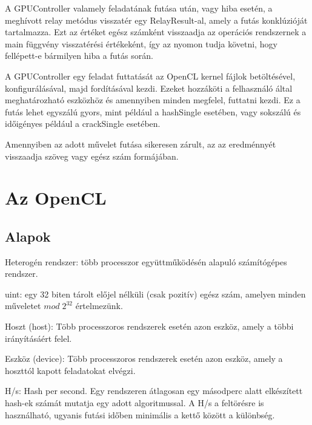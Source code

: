 A GPUController valamely feladatának futása után, vagy hiba esetén, a meghívott relay metódus visszatér egy RelayResult-al, amely a futás konklúzióját tartalmazza. Ezt az értéket egész számként visszaadja az operációs rendszernek a main függvény visszatérési értékeként, így az nyomon tudja követni, hogy fellépett-e bármilyen hiba a futás során.

A GPUController egy feladat futtatását az OpenCL kernel fájlok betöltésével, konfigurálásával, majd fordításával kezdi. Ezeket hozzáköti a felhasználó által meghatározható eszközhöz és amennyiben minden megfelel, futtatni kezdi. Ez a futás lehet egyszálú gyors, mint például a hashSingle esetében, vagy sokszálú és időigényes például a crackSingle esetében.

Amennyiben az adott művelet futása sikeresen zárult, az az eredménnyét visszaadja szöveg vagy egész szám formájában.

\section{Az OpenCL}



\subsection{Alapok}


\begin{definition}
Heterogén rendszer: több processzor együttműködésén alapuló számítógépes rendszer.
\end{definition}

\begin{definition}
uint: egy 32 biten tárolt előjel nélküli (csak pozitív) egész szám, amelyen minden műveletet $mod \; 2^{32}$ értelmezünk.
\end{definition}

\begin{definition}
Hoszt (host): Több processzoros rendszerek esetén azon eszköz, amely a többi irányításáért felel.
\end{definition}

\begin{definition}
Eszköz (device): Több processzoros rendszerek esetén azon eszköz, amely a hoszttól kapott feladatokat elvégzi.
\end{definition}

\begin{definition}
H/s: Hash per second. Egy rendszeren átlagosan egy másodperc alatt elkészített hash-ek számát mutatja egy adott algoritmussal. A H/s a feltörésre is használható, ugyanis futási időben minimális a kettő között a különbség.
\end{definition}


